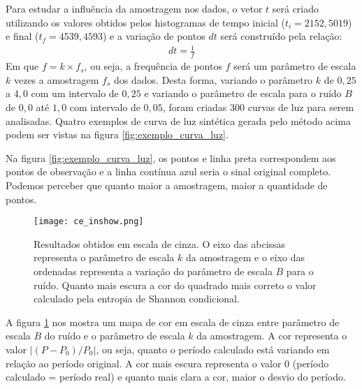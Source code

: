 Para estudar a influência da amostragem nos dados, o vetor $t$ será criado utilizando os valores obtidos pelos histogramas de tempo inicial ($t_i = 2152,5019$) e final ($t_f = 4539,4593$) e a variação de pontos $dt$ será construído pela relação:
\begin{align}
dt = \frac{1}{f}
\end{align}
Em que $f = k \times f_s$, ou seja, a frequência de pontos $f$ será um parâmetro de escala $k$ vezes a amostragem $f_s$ dos dados. Desta forma, variando o parâmetro $k$ de $0,25$ a $4,0$ com um intervalo de $0,25$ e variando o parâmetro de escala para o ruído $B$ de $0,0$ até $1,0$ com intervalo de $0,05$, foram criadas 300 curvas de luz para serem analisadas. Quatro exemplos de curva de luz sintética gerada pelo método acima podem ser vistas na figura \ref{fig:exemplo_curva_luz}.




Na figura \ref{fig:exemplo_curva_luz}, os pontos e linha preta correspondem aos pontos de observação e a linha contínua azul seria o sinal original completo. Podemos perceber que quanto maior a amostragem, maior a quantidade de pontos.

\begin{figure}[H]
\centering
\hspace{-2.5cm}\texttt{[image: ce\_inshow.png]}
\caption[Resultados obtidos em escala de cinza.]{Resultados obtidos em escala de cinza. O eixo das abcissas representa o parâmetro de escala $k$ da amostragem e o eixo das ordenadas representa a variação do parâmetro de escala $B$ para o ruído. Quanto mais escura a cor do quadrado mais correto o valor calculado pela entropia de Shannon condicional.}
\label{fig:imshow}
\end{figure}

A figura \ref{fig:imshow} nos mostra um mapa de cor em escala de cinza entre parâmetro de escala $B$ do ruído e o parâmetro de escala $k$ da amostragem. A cor representa o valor $|(P - P_0)/P_0|$, ou seja, quanto o período calculado está variando em relação ao período original. A cor mais escura representa o valor 0 (período calculado = período real) e quanto mais clara a cor, maior o desvio do período.



